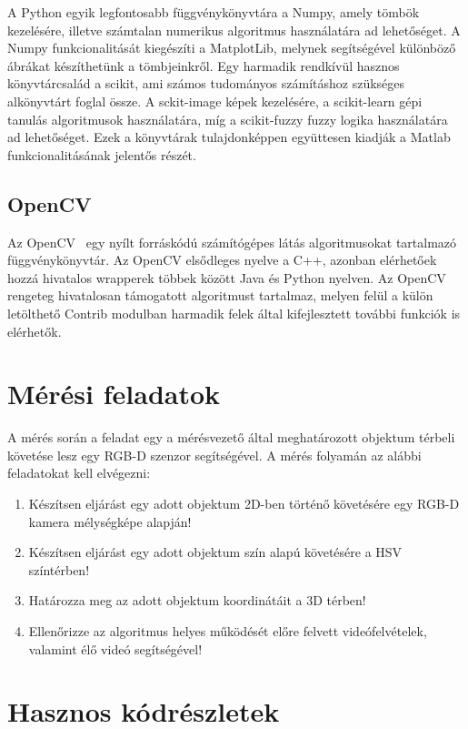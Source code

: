 \documentclass[12pt,a4paper,oneside]{report}             %
\begin{document}
A Python egyik legfontosabb függvénykönyvtára a Numpy, amely tömbök kezelésére, illetve számtalan numerikus algoritmus használatára ad lehetőséget. A Numpy funkcionalitását kiegészíti a MatplotLib, melynek segítségével különböző ábrákat készíthetünk a tömbjeinkről. Egy harmadik rendkívül hasznos könyvtárcsalád a scikit, ami számos tudományos számításhoz szükséges alkönyvtárt foglal össze. A sckit-image képek kezelésére, a scikit-learn gépi tanulás algoritmusok használatára, míg a scikit-fuzzy fuzzy logika használatára ad lehetőséget. Ezek a könyvtárak tulajdonképpen együttesen kiadják a Matlab funkcionalitásának jelentős részét.

\section{OpenCV}

Az OpenCV~\cite{opencv} egy nyílt forráskódú számítógépes látás algoritmusokat tartalmazó függvénykönyvtár. Az OpenCV elsődleges nyelve a C++, azonban elérhetőek hozzá hivatalos wrapperek többek között Java és Python nyelven. Az OpenCV rengeteg hivatalosan támogatott algoritmust tartalmaz, melyen felül a külön letölthető Contrib modulban harmadik felek által kifejlesztett további funkciók is elérhetők.

\chapter{Mérési feladatok}

A mérés során a feladat egy a mérésvezető által meghatározott objektum térbeli követése lesz egy RGB-D szenzor segítségével. A mérés folyamán az alábbi feladatokat kell elvégezni:

\begin{enumerate}
\item Készítsen eljárást egy adott objektum 2D-ben történő követésére egy RGB-D kamera mélységképe alapján!
\item Készítsen eljárást egy adott objektum szín alapú követésére a HSV színtérben!
\item Határozza meg az adott objektum koordinátáit a 3D térben!
\item Ellenőrizze az algoritmus helyes működését előre felvett videófelvételek, valamint élő videó segítségével!
\end{enumerate}

\chapter{Hasznos kódrészletek}
\end{document}
